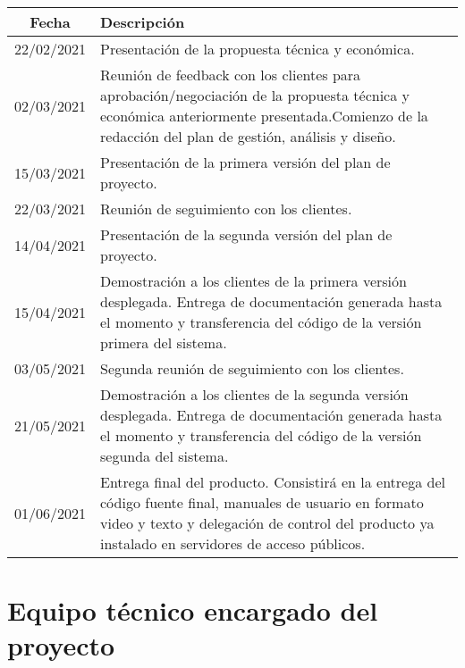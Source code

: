 \documentclass{article}
\begin{document}
\begin{table}[H]
    \centering
    \begin{tabular}{| c | p{30em} |}
    \hline
        Fecha &  Descripción  \\ 
        \hline
        22/02/2021 & Presentación de la propuesta técnica y económica.  \\ 
        \hline
        02/03/2021 & Reunión de feedback con los clientes para aprobación/negociación de la propuesta técnica y económica anteriormente presentada.Comienzo de la redacción del plan de gestión, análisis y diseño. \\ 
        \hline
        15/03/2021 & Presentación de la primera versión del plan de proyecto.\\ \hline
        22/03/2021 & Reunión de seguimiento con los clientes. \\ 
        \hline
        14/04/2021 & Presentación de la segunda versión del plan de proyecto. \\ \hline
        15/04/2021 & Demostración a los clientes de la primera versión desplegada.
        Entrega de documentación generada hasta el momento y transferencia del código de la versión primera del sistema.\\ 
        \hline
        03/05/2021 & Segunda reunión de seguimiento con los clientes. \\ 
        \hline
        21/05/2021 & Demostración a los clientes de la segunda versión desplegada.
        Entrega de documentación generada hasta el momento y transferencia del código de la versión segunda del sistema.\\ 
        \hline
        01/06/2021 & Entrega final del producto. Consistirá en la entrega del código fuente final, manuales de usuario en formato video y texto y delegación de control del producto ya instalado en servidores de acceso públicos.\\ \hline
    \end{tabular}
\end{table}

\section{Equipo técnico encargado del proyecto}
\end{document}
